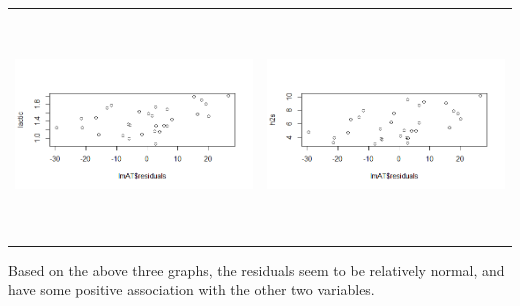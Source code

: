 \documentclass[12pt]{article}
\begin{document}
\begin{center}
	\begin{tabular}{cc}
		\includegraphics[width=.5\textwidth, height=60mm, keepaspectratio]{images/1155/1155_acetic_lactic_residuals_vs_lactic.png} & \includegraphics[width=.5\textwidth, height=60mm, keepaspectratio]{images/1155/1155_acetice_taste_residuals_vs_h2s.png}\\
	\end{tabular}\par
	
	Based on the above three graphs, the residuals seem to be relatively normal, and have some positive association with the other two variables.\par
	\end{center}\par
	
	
\newpage
\end{document}

